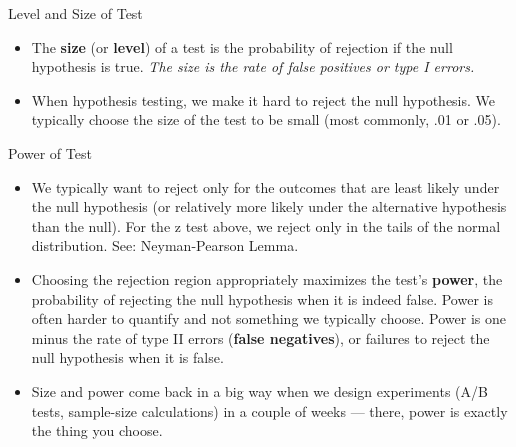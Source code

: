 \documentclass[aspectratio=169,11pt]{beamer}
\begin{document}
\begin{frame}{Level and Size of Test}
\begin{itemize}
	\item The {\bf size} (or {\bf level}) of a test is the probability of rejection if the null hypothesis is true. 
	\emph{The size is the rate of false positives or type I errors.}

	\item When hypothesis testing, we make it hard to reject the null hypothesis. We typically choose the 
	size of the test to be small (most commonly, .01 or .05).

\end{itemize}
\end{frame}




\begin{frame}{Power of Test}
\begin{itemize}

	\item We typically want to reject only for the outcomes that are least likely under the null
	hypothesis (or relatively more likely under the alternative hypothesis than the null). For
	the z test above, we reject only in the tails of the normal distribution. See: Neyman-Pearson Lemma.
	
	\medskip
	\item Choosing the rejection region appropriately maximizes the test's {\bf power}, the
	probability of rejecting the null hypothesis when it is indeed false. Power is often harder
	to quantify and not something we typically choose. Power is one minus the rate of
	type II errors (\textbf{false negatives}), or failures to reject the null hypothesis when it is false.

	\medskip
	\item Size and power come back in a big way when we \alert{design} experiments
	(A/B tests, sample-size calculations) in a couple of weeks --- there, power is
	exactly the thing you choose.
\end{itemize}
\end{frame}
\end{document}
